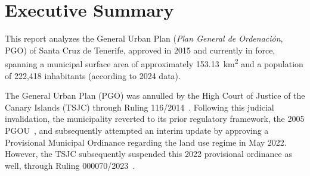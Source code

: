 \section{Executive Summary}
This report analyzes the General Urban Plan (\emph{Plan General de Ordenación}, PGO) of Santa Cruz de Tenerife, approved in 2015 and currently in force, spanning a municipal surface area of approximately 153.13~km\textsuperscript{2} and a population of 222,418 inhabitants (according to 2024 data).

The General Urban Plan (PGO) was annulled by the High Court of Justice of the Canary Islands (TSJC) through Ruling 116/2014~\cite{tsjc_116_2014}. Following this judicial invalidation, the municipality reverted to its prior regulatory framework, the 2005 PGOU~\cite{pgou_santacruz_2005}, and subsequently attempted an interim update by approving a Provisional Municipal Ordinance regarding the land use regime in May 2022. However, the TSJC subsequently suspended this 2022 provisional ordinance as well, through Ruling 000070/2023~\cite{tsjc_070_2023}.







